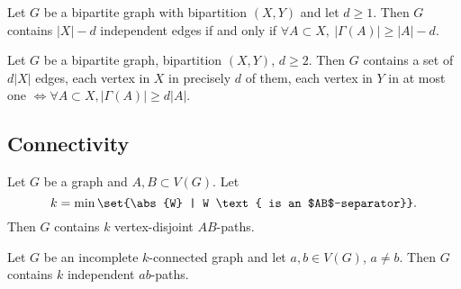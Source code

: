 \documentclass{article}
\begin{document}
\begin{ncor}\label{cor:32}
    Let $G$ be a bipartite graph with bipartition $(X,Y)$ and let $d \geq 1$.
    Then $G$ contains $|X|-d$ independent edges if and only if $\forall A \subset X, \ |\Gamma(A)| \geq |A| - d$.
\end{ncor}

\begin{ncor}\label{cor:33}
    Let $G$ be a bipartite graph, bipartition $(X,Y)$, $d \geq 2$.
    Then $G$ contains a set of $d |X|$ edges, each vertex in $X$ in precisely $d$ of them, each vertex in $Y$ in at most one $\iff \forall A \subset X, |\Gamma(A)| \geq d |A|$.
\end{ncor}



\subsection{Connectivity}
























\begin{nthm}\label{thm:34}
    Let $G$ be a graph and $A,B \subset V(G)$.
    Let
    \begin{equation*}
        k = \min \set{\abs{W} | W \text{ is an $AB$-separator}}.
    \end{equation*}
    Then $G$ contains $k$ vertex-disjoint $AB$-paths.
\end{nthm}





\begin{ncor}\label{cor:35}
    Let $G$ be an incomplete $k$-connected graph and let $a,b \in V(G)$, $a \neq b$.
    Then $G$ contains $k$ independent $ab$-paths.
\end{ncor}
\end{document}
